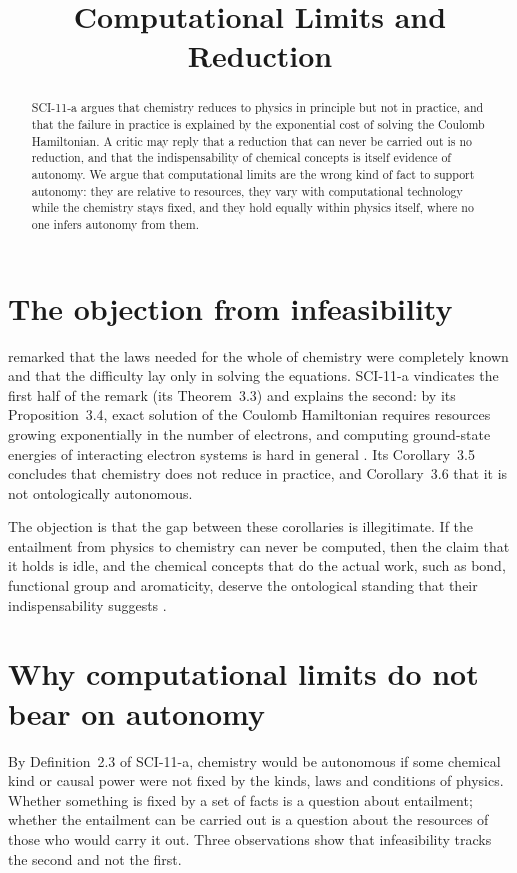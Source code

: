 \documentclass{situationist-preprint}
\title{Computational Limits and Reduction}
\begin{document}
\maketitle

\begin{abstract}
SCI-11-a argues that chemistry reduces to physics in principle but not in practice, and that the failure in practice is explained by the exponential cost of solving the Coulomb Hamiltonian. A critic may reply that a reduction that can never be carried out is no reduction, and that the indispensability of chemical concepts is itself evidence of autonomy. We argue that computational limits are the wrong kind of fact to support autonomy: they are relative to resources, they vary with computational technology while the chemistry stays fixed, and they hold equally within physics itself, where no one infers autonomy from them.
\end{abstract}

\section{The objection from infeasibility}

\citet{Dirac1929} remarked that the laws needed for the whole of chemistry were completely known and that the difficulty lay only in solving the equations. SCI-11-a vindicates the first half of the remark (its Theorem~3.3) and explains the second: by its Proposition~3.4, exact solution of the Coulomb Hamiltonian requires resources growing exponentially in the number of electrons, and computing ground-state energies of interacting electron systems is hard in general \citep{SchuchVerstraete2009}. Its Corollary~3.5 concludes that chemistry does not reduce in practice, and Corollary~3.6 that it is not ontologically autonomous.

The objection is that the gap between these corollaries is illegitimate. If the entailment from physics to chemistry can never be computed, then the claim that it holds is idle, and the chemical concepts that do the actual work, such as bond, functional group and aromaticity, deserve the ontological standing that their indispensability suggests \citep{Hendry2010}.

\section{Why computational limits do not bear on autonomy}

By Definition~2.3 of SCI-11-a, chemistry would be autonomous if some chemical kind or causal power were not fixed by the kinds, laws and conditions of physics. Whether something is fixed by a set of facts is a question about entailment; whether the entailment can be carried out is a question about the resources of those who would carry it out. Three observations show that infeasibility tracks the second and not the first.
\end{document}
